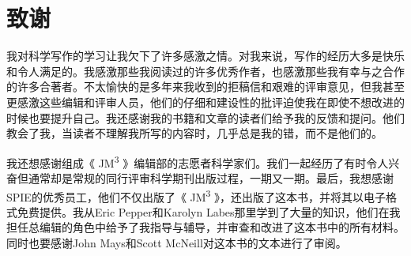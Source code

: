 \section*{致谢}
我对科学写作的学习让我欠下了许多感激之情。对我来说，写作的经历大多是快乐和令人满足的。我感激那些我阅读过的许多优秀作者，也感激那些我有幸与之合作的许多合著者。不太愉快的是多年来我收到的拒稿信和艰难的评审意见，但我甚至更感激这些编辑和评审人员，他们的仔细和建设性的批评迫使我在即使不想改进的时候也要提升自己。我还感谢我的书籍和文章的读者们给予我的反馈和提问。他们教会了我，当读者不理解我所写的内容时，几乎总是我的错，而不是他们的。

我还想感谢组成《 JM\textsuperscript{3} 》编辑部的志愿者科学家们。我们一起经历了有时令人兴奋但通常却是常规的同行评审科学期刊出版过程，一期又一期。最后，我想感谢SPIE的优秀员工，他们不仅出版了《 JM\textsuperscript{3} 》，还出版了这本书，并将其以电子格式免费提供。我从Eric Pepper和Karolyn Labes那里学到了大量的知识，他们在我担任总编辑的角色中给予了我指导与辅导，并审查和改进了这本书中的所有材料。同时也要感谢John Mays和Scott McNeill对这本书的文本进行了审阅。

